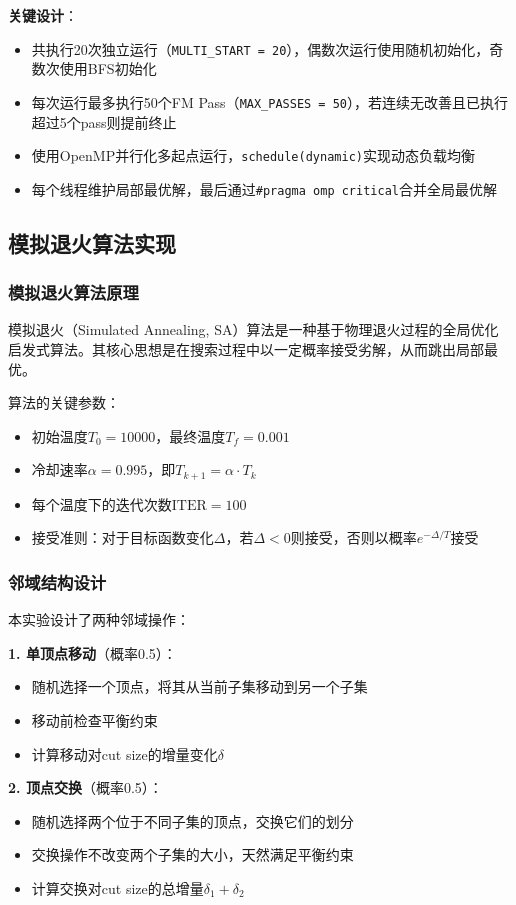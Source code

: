 \documentclass{SYSUReport}
\begin{document}
\textbf{关键设计}：
\begin{itemize}
\item 共执行20次独立运行（\texttt{MULTI\_START = 20}），偶数次运行使用随机初始化，奇数次使用BFS初始化
\item 每次运行最多执行50个FM Pass（\texttt{MAX\_PASSES = 50}），若连续无改善且已执行超过5个pass则提前终止
\item 使用OpenMP并行化多起点运行，\texttt{schedule(dynamic)}实现动态负载均衡
\item 每个线程维护局部最优解，最后通过\texttt{\#pragma omp critical}合并全局最优解
\end{itemize}

\subsection{模拟退火算法实现}
\subsubsection{模拟退火算法原理}
模拟退火（Simulated Annealing, SA）算法是一种基于物理退火过程的全局优化启发式算法。其核心思想是在搜索过程中以一定概率接受劣解，从而跳出局部最优。

算法的关键参数：
\begin{itemize}
\item 初始温度$T_0 = 10000$，最终温度$T_f = 0.001$
\item 冷却速率$\alpha = 0.995$，即$T_{k+1} = \alpha \cdot T_k$
\item 每个温度下的迭代次数$\text{ITER} = 100$
\item 接受准则：对于目标函数变化$\Delta$，若$\Delta < 0$则接受，否则以概率$e^{-\Delta/T}$接受
\end{itemize}

\subsubsection{邻域结构设计}
本实验设计了两种邻域操作：

\textbf{1. 单顶点移动}（概率0.5）：
\begin{itemize}
\item 随机选择一个顶点，将其从当前子集移动到另一个子集
\item 移动前检查平衡约束
\item 计算移动对cut size的增量变化$\delta$
\end{itemize}

\textbf{2. 顶点交换}（概率0.5）：
\begin{itemize}
\item 随机选择两个位于不同子集的顶点，交换它们的划分
\item 交换操作不改变两个子集的大小，天然满足平衡约束
\item 计算交换对cut size的总增量$\delta_1 + \delta_2$
\end{itemize}
\end{document}
